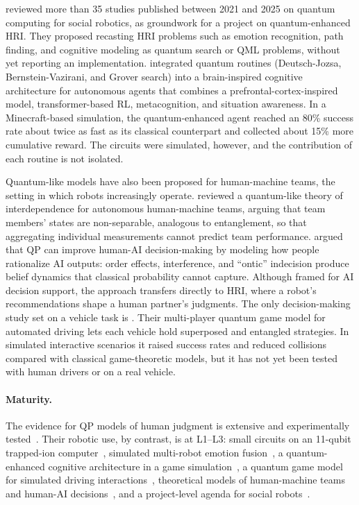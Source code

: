 \documentclass[acmsmall,screen,review]{acmart}
\begin{document}
\citet{DeCarolis2025} reviewed more than 35 studies published between 2021 and 2025 on quantum computing for social robotics, as groundwork for a project on quantum-enhanced HRI. They proposed recasting HRI problems such as emotion recognition, path finding, and cognitive modeling as quantum search or QML problems, without yet reporting an implementation. \citet{Daglarli2025} integrated quantum routines (Deutsch-Jozsa, Bernstein-Vazirani, and Grover search) into a brain-inspired cognitive architecture for autonomous agents that combines a prefrontal-cortex-inspired model, transformer-based RL, metacognition, and situation awareness. In a Minecraft-based simulation, the quantum-enhanced agent reached an 80\% success rate about twice as fast as its classical counterpart and collected about 15\% more cumulative reward. The circuits were simulated, however, and the contribution of each routine is not isolated.

Quantum-like models have also been proposed for human-machine teams, the setting in which robots increasingly operate. \citet{Lawless2023} reviewed a quantum-like theory of interdependence for autonomous human-machine teams, arguing that team members' states are non-separable, analogous to entanglement, so that aggregating individual measurements cannot predict team performance. \citet{Humr2025} argued that QP can improve human-AI decision-making by modeling how people rationalize AI outputs: order effects, interference, and ``ontic'' indecision produce belief dynamics that classical probability cannot capture. Although framed for AI decision support, the approach transfers directly to HRI, where a robot's recommendations shape a human partner's judgments. The only decision-making study set on a vehicle task is \citet{Essalmi2026}. Their multi-player quantum game model for automated driving lets each vehicle hold superposed and entangled strategies. In simulated interactive scenarios it raised success rates and reduced collisions compared with classical game-theoretic models, but it has not yet been tested with human drivers or on a real vehicle.

\paragraph{Maturity.} The evidence for QP models of human judgment is extensive and experimentally tested~\cite{Pothos2022}. Their robotic use, by contrast, is at L1--L3: small circuits on an 11-qubit trapped-ion computer~\cite{Widdows2023}, simulated multi-robot emotion fusion~\cite{Yan2021}, a quantum-enhanced cognitive architecture in a game simulation~\cite{Daglarli2025}, a quantum game model for simulated driving interactions~\cite{Essalmi2026}, theoretical models of human-machine teams~\cite{Lawless2023} and human-AI decisions~\cite{Humr2025}, and a project-level agenda for social robots~\cite{DeCarolis2025}.
\end{document}
